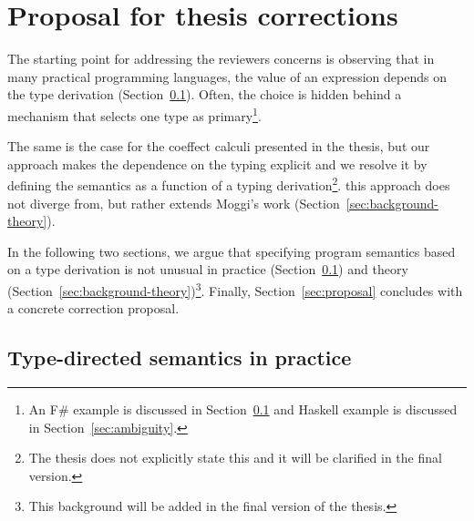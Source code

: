 \documentclass[
		twoside,openright,titlepage,numbers=noenddot,headinclude,%
                footinclude=true,cleardoublepage=empty,
                BCOR=10mm,paper=a4,fontsize=10pt, %
                ngerman,american, %
                ]{scrreprt}
\begin{document}
\frenchspacing %
\raggedbottom %
\pagestyle{plain} %



\chapter*{Proposal for thesis corrections}
\renewcommand*\thesection{\arabic{section}}

The starting point for addressing the reviewers concerns is observing that in many practical
programming languages, the value of an expression depends on the type derivation
(Section~\ref{sec:background-practice}). Often, the choice is hidden behind a mechanism that
selects one type as primary\footnote{An F\# example is discussed in Section~\ref{sec:background-practice}
and Haskell example is discussed in Section~\ref{sec:ambiguity}.}. 

The same is the case for the coeffect calculi presented in the thesis, but 
our approach makes the dependence on the typing explicit and we resolve it by
defining the semantics as a function of a typing derivation\footnote{The thesis does not explicitly
state this and it will be clarified in the final version.}. 
this approach does not diverge from, but rather extends Moggi's work \cite{monad-notions}
(Section~\ref{sec:background-theory}).

In the following two sections, we argue that specifying program semantics based on a type derivation
is not unusual in practice (Section~\ref{sec:background-practice}) and theory
(Section~\ref{sec:background-theory})\footnote{This background will be added in the final version of the thesis.}.
Finally, Section~\ref{sec:proposal} concludes with a concrete correction proposal.

\section{Type-directed semantics in practice}
\label{sec:background-practice}
\vspace{-1em}
\end{document}
